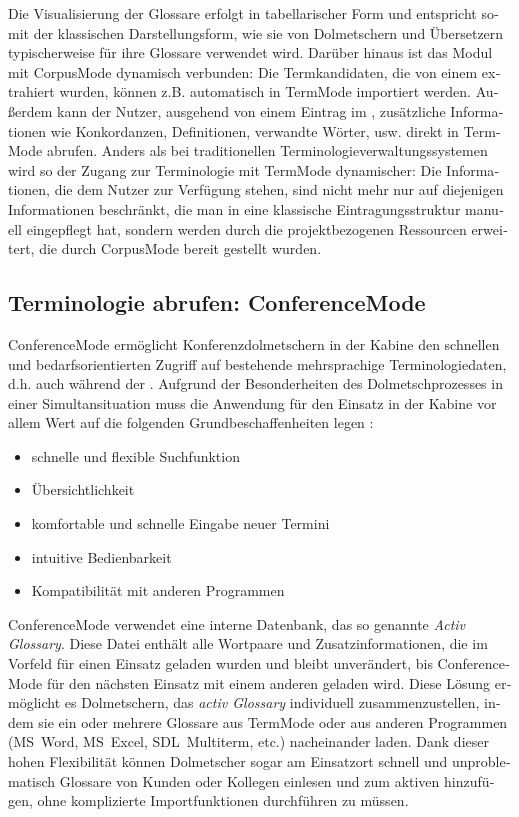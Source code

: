 \documentclass[output=paper]{LSP/langsci}
\begin{document}
\begin{otherlanguage}{ngerman}
\largerpage
Die Visualisierung der Glossare erfolgt in tabellarischer Form und entspricht somit der klassischen Darstellungsform, wie sie von Dolmetschern und Übersetzern typischerweise für ihre Glossare verwendet wird. Darüber hinaus ist das Modul mit CorpusMode dynamisch verbunden: Die Termkandidaten, die von einem  extrahiert wurden, können z.B. automatisch in TermMode importiert werden. Außerdem kann der Nutzer, ausgehend von einem Eintrag im , zusätzliche Informationen wie Konkordanzen, Definitionen, verwandte Wörter, usw. direkt in TermMode abrufen. Anders als bei traditionellen Terminologieverwaltungssystemen wird so der Zugang zur Terminologie mit TermMode dynamischer: Die Informationen, die dem Nutzer zur Verfügung stehen, sind nicht mehr nur auf diejenigen Informationen beschränkt, die man in eine klassische Eintragungsstruktur manuell eingepflegt hat, sondern werden durch die projektbezogenen Ressourcen erweitert, die durch CorpusMode bereit gestellt wurden. 

\subsection{Terminologie abrufen: ConferenceMode}\label{sec:fantinuoli:6.3}

ConferenceMode ermöglicht Konferenzdolmetschern in der Kabine den schnellen und bedarfsorientierten Zugriff auf bestehende mehrsprachige Terminologiedaten, d.h. auch während der . Aufgrund der Besonderheiten des Dolmetschprozesses in einer Simultansituation muss die Anwendung für den Einsatz in der Kabine vor allem Wert auf die folgenden Grundbeschaffenheiten legen \citep{SDI2007}:

\begin{itemize}
\item  
schnelle und flexible Suchfunktion 
\item  
Übersichtlichkeit 
\item  
komfortable und schnelle Eingabe neuer Termini 
\item  
intuitive Bedienbarkeit 
\item  
Kompatibilität mit anderen Programmen 
\end{itemize}

\newpage 
ConferenceMode verwendet eine interne Datenbank, das so genannte \textit{Activ Glossary}. Diese Datei enthält alle Wortpaare und Zusatzinformationen, die im Vorfeld für einen Einsatz geladen wurden und bleibt unverändert, bis ConferenceMode für den nächsten Einsatz mit einem anderen  geladen wird. Diese Lösung ermöglicht es Dolmetschern, das \textit{activ Glossary} individuell zusammenzustellen, indem sie ein oder mehrere Glossare aus TermMode oder aus anderen Programmen (MS~Word, MS~Excel, SDL~Multiterm, etc.) nacheinander laden. Dank dieser hohen Flexibilität können Dolmetscher sogar am Einsatzort schnell und unproblematisch Glossare von Kunden oder Kollegen einlesen und zum aktiven  hinzufügen, ohne komplizierte Importfunktionen durchführen zu müssen. 


\end{otherlanguage}
\end{document}
